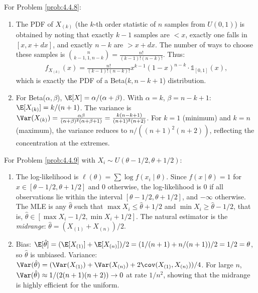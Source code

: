 \begin{solucion}
	\label{sol:4.4.8}
	For Problem \ref{prob:4.4.8}:
	\begin{enumerate}
		\item The PDF of $X_{(k)}$ (the $k$-th order statistic of $n$ samples from $U(0,1)$) is obtained by noting that exactly $k-1$ samples are $< x$, exactly one falls in $[x, x+dx]$, and exactly $n-k$ are $> x+dx$. The number of ways to choose these samples is $\binom{n}{k-1, 1, n-k} = \frac{n!}{(k-1)!(n-k)!}$. Thus:
		\begin{align*}
			f_{X_{(k)}}(x) = \frac{n!}{(k-1)!(n-k)!} x^{k-1}(1-x)^{n-k} \cdot \mathbb{1}_{[0,1]}(x),
		\end{align*}
		which is exactly the PDF of a Beta($k, n-k+1$) distribution.
		\item For Beta($\alpha, \beta$), $\E[X] = \alpha/(\alpha+\beta)$. With $\alpha = k$, $\beta = n-k+1$: $\E[X_{(k)}] = k/(n+1)$. The variance is $\Var(X_{(k)}) = \frac{\alpha\beta}{(\alpha+\beta)^{2}(\alpha+\beta+1)} = \frac{k(n-k+1)}{(n+1)^{2}(n+2)}$. For $k=1$ (minimum) and $k=n$ (maximum), the variance reduces to $n/((n+1)^{2}(n+2))$, reflecting the concentration at the extremes.
	\end{enumerate}
\end{solucion}

\begin{solucion}
	\label{sol:4.4.9}
	For Problem \ref{prob:4.4.9} with $X_{i} \sim U(\theta - 1/2, \theta + 1/2)$:
	\begin{enumerate}
		\item The log-likelihood is $\ell(\theta) = \sum \log f(x_i \mid \theta)$. Since $f(x \mid \theta) = 1$ for $x \in [\theta - 1/2, \theta + 1/2]$ and $0$ otherwise, the log-likelihood is $0$ if all observations lie within the interval $[\theta - 1/2, \theta + 1/2]$, and $-\infty$ otherwise. The MLE is any $\hat{\theta}$ such that $\max X_i \le \hat{\theta} + 1/2$ and $\min X_i \ge \hat{\theta} - 1/2$, that is, $\hat{\theta} \in [\max X_i - 1/2, \min X_i + 1/2]$. The natural estimator is the \emph{midrange}: $\hat{\theta} = (X_{(1)} + X_{(n)})/2$.
		\item Bias: $\E[\hat{\theta}] = (\E[X_{(1)}] + \E[X_{(n)}])/2 = (1/(n+1) + n/(n+1))/2 = 1/2 = \theta$, so $\hat{\theta}$ is unbiased. Variance: $\Var(\hat{\theta}) = (\Var(X_{(1)}) + \Var(X_{(n)}) + 2\cov(X_{(1)}, X_{(n)}))/4$. For large $n$, $\Var(\hat{\theta}) \approx 1/(2(n+1)(n+2)) \to 0$ at rate $1/n^{2}$, showing that the midrange is highly efficient for the uniform.
	\end{enumerate}
\end{solucion}

